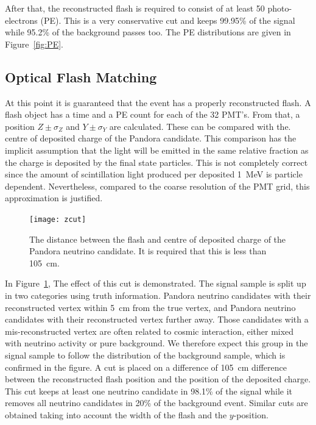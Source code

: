 After that, the reconstructed flash is required to consist of at least 50 photo-electrons (PE). This is a very conservative cut and keeps 99.95\% of the signal while 95.2\% of the background passes too. The PE distributions are given in Figure~\ref{fig:PE}.


\subsection{Optical Flash Matching}

At this point it is guaranteed that the event has a properly reconstructed flash. A flash object has a time and a PE count for each of the 32 PMT's. From that, a position $Z\pm \sigma_Z$ and $Y\pm \sigma_Y$ are calculated. These can be compared with the. centre of deposited charge of the Pandora candidate. This comparison has the implicit assumption that the light will be emitted in the same relative fraction as the charge is deposited by the final state particles. This is not completely correct since the amount of scintillation light produced per deposited \SI{1}{\MeV} is particle dependent. Nevertheless, compared to the coarse resolution of the PMT grid, this approximation is justified. 

\begin{figure}[htbp]
\centering
\texttt{[image: zcut]}
\caption{The distance between the flash and centre of deposited charge of the Pandora neutrino candidate. It is required that this is less than \SI{105}{\cm}.} 
\label{fig:zcut}
\end{figure}

In Figure~\ref{fig:zcut}, The effect of this cut is demonstrated. The signal sample is split up in two categories using truth information. Pandora neutrino candidates with their reconstructed vertex within \SI{5}{\cm} from the true vertex, and Pandora neutrino candidates with their reconstructed vertex further away. Those candidates with a mis-reconstructed vertex are often related to cosmic interaction, either mixed with neutrino activity or pure background. We therefore expect this group in the signal sample to follow the distribution of the background sample, which is confirmed in the figure. A cut is placed on a difference of \SI{105}{\cm} difference between the reconstructed flash position and the position of the deposited charge. This cut keeps at least one neutrino candidate in 98.1\% of the signal while it removes all neutrino candidates in 20\% of the background event. 
Similar cuts are obtained taking into account the width of the flash and the $y$-position. 

